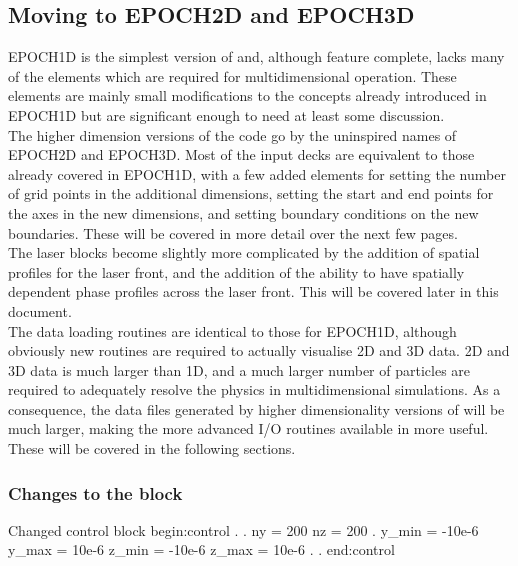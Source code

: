 \subsection{Moving to EPOCH2D and EPOCH3D}
EPOCH1D is the simplest version of {\EPOCH} and, although feature complete,
lacks many of the elements which are required for multidimensional operation.
These elements are mainly small modifications to the concepts already
introduced in EPOCH1D but are significant enough to need at least some
discussion.\\

The higher dimension versions of the code go by the uninspired names of EPOCH2D
and EPOCH3D. Most of the input decks are equivalent to those already covered in
EPOCH1D, with a few added elements for setting the number of grid points in the
additional dimensions, setting the start and end points for the axes in the new
dimensions, and setting boundary conditions on the new boundaries. These will
be covered in more detail over the next few pages.\\

The laser blocks become slightly more complicated by the addition of spatial
profiles for the laser front, and the addition of the ability to have spatially
dependent phase profiles across the laser front. This will be covered later in
this document.\\

The data loading routines are identical to those for EPOCH1D, although
obviously new routines are required to actually visualise 2D and 3D data. 2D
and 3D data is much larger than 1D, and a much larger number of particles are
required to adequately resolve the physics in multidimensional simulations. As
a consequence, the data files generated by higher dimensionality versions of
{\EPOCH} will be much larger, making the more advanced I/O routines available
in {\EPOCH} more useful. These will be covered in the following sections.\\

\subsubsection{Changes to the  block}

\begin{lboxverbatim}{Changed control block}
begin:control
   .
   .
   ny = 200
   nz = 200
   .
   y_min = -10e-6
   y_max = 10e-6
   z_min = -10e-6
   z_max = 10e-6
   .
   .
end:control
\end{lboxverbatim}

